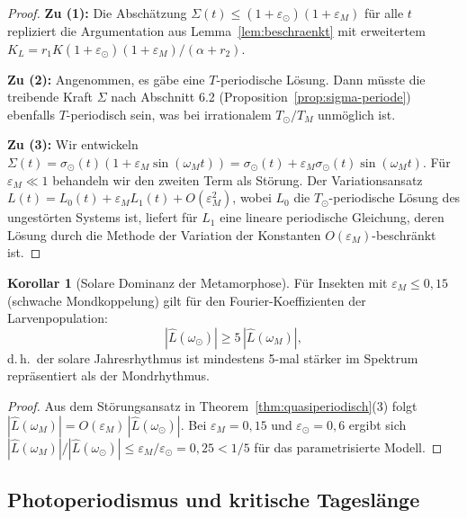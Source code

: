 ﻿\documentclass[12pt, a4paper]{article}
\theoremstyle{definition}
\newtheorem{korollar}[theorem]{Korollar}
\begin{document}
\begin{proof}
\textbf{Zu (1):} Die Abschätzung $\Sigma(t) \leq (1+\varepsilon_{\odot})(1+\varepsilon_M)$
für alle $t$ repliziert die Argumentation aus Lemma~\ref{lem:beschraenkt} mit
erweitertem $K_L = r_1 K (1+\varepsilon_{\odot})(1+\varepsilon_M)/(\alpha+r_2)$.

\textbf{Zu (2):} Angenommen, es gäbe eine $T$-periodische Lösung. Dann müsste
die treibende Kraft $\Sigma$ nach Abschnitt 6.2 (Proposition~\ref{prop:sigma-periode})
ebenfalls $T$-periodisch sein, was bei irrationalem $T_{\odot}/T_M$ unmöglich ist.

\textbf{Zu (3):} Wir entwickeln $\Sigma(t) = \sigma_{\odot}(t)(1 + \varepsilon_M\sin(\omega_M t))
= \sigma_{\odot}(t) + \varepsilon_M\sigma_{\odot}(t)\sin(\omega_M t)$.
Für $\varepsilon_M \ll 1$ behandeln wir den zweiten Term als Störung.
Der Variationsansatz $L(t) = L_0(t) + \varepsilon_M L_1(t) + O(\varepsilon_M^2)$,
wobei $L_0$ die $T_{\odot}$-periodische Lösung des ungestörten Systems ist,
liefert für $L_1$ eine lineare periodische Gleichung, deren Lösung
durch die Methode der Variation der Konstanten $O(\varepsilon_M)$-beschränkt ist. \hfill
\end{proof}

\begin{korollar}[Solare Dominanz der Metamorphose]\label{cor:solare-dominanz}
Für Insekten mit $\varepsilon_M \leq 0{,}15$ (schwache Mondkoppelung) gilt für
den Fourier-Koeffizienten der Larvenpopulation:
\[
  |\hat{L}(\omega_{\odot})| \geq 5\,|\hat{L}(\omega_M)|,
\]
d.\,h.\ der solare Jahresrhythmus ist mindestens 5-mal stärker im Spektrum
repräsentiert als der Mondrhythmus.
\end{korollar}

\begin{proof}
Aus dem Störungsansatz in Theorem~\ref{thm:quasiperiodisch}(3) folgt
$|\hat{L}(\omega_M)| = O(\varepsilon_M)\,|\hat{L}(\omega_{\odot})|$.
Bei $\varepsilon_M = 0{,}15$ und $\varepsilon_{\odot} = 0{,}6$ ergibt sich
$|\hat{L}(\omega_M)|/|\hat{L}(\omega_{\odot})| \leq \varepsilon_M/\varepsilon_{\odot}
= 0{,}25 < 1/5$ für das parametrisierte Modell. \hfill
\end{proof}

\subsection{Photoperiodismus und kritische Tageslänge}
\end{document}

